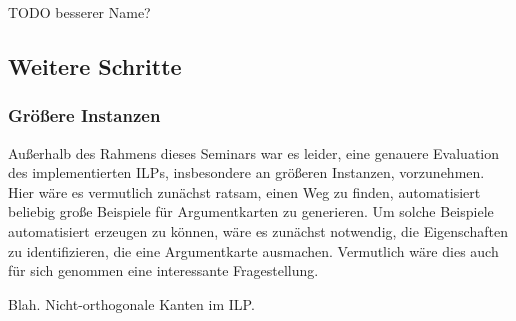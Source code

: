 

TODO besserer Name?

\subsection{Weitere Schritte}

\subsubsection{Größere Instanzen}
\label{sub:next:bigger}

Außerhalb des Rahmens dieses Seminars war es leider, eine genauere Evaluation des implementierten ILPs, insbesondere an größeren Instanzen, vorzunehmen. Hier wäre es vermutlich zunächst ratsam, einen Weg zu finden, automatisiert beliebig große Beispiele für Argumentkarten zu generieren. Um solche Beispiele automatisiert erzeugen zu können, wäre es zunächst notwendig, die Eigenschaften zu identifizieren, die eine Argumentkarte ausmachen. Vermutlich wäre dies auch für sich genommen eine interessante Fragestellung.

Blah. Nicht-orthogonale Kanten im ILP.
